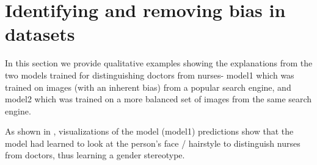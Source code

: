 \vspace{-15pt}
\section{Identifying and removing bias in datasets}\label{sec:sup_bias}

In this section we provide qualitative examples showing the explanations from the two models trained for distinguishing doctors from nurses- model1 which was trained on images (with an inherent bias) from a popular search engine, and model2 which was trained on a more balanced set of images from the same search engine.

As shown in , \gcam{} visualizations of the model (model1) predictions show that
the model had learned to look at the person's face / hairstyle to distinguish nurses from doctors, thus learning a gender stereotype.


